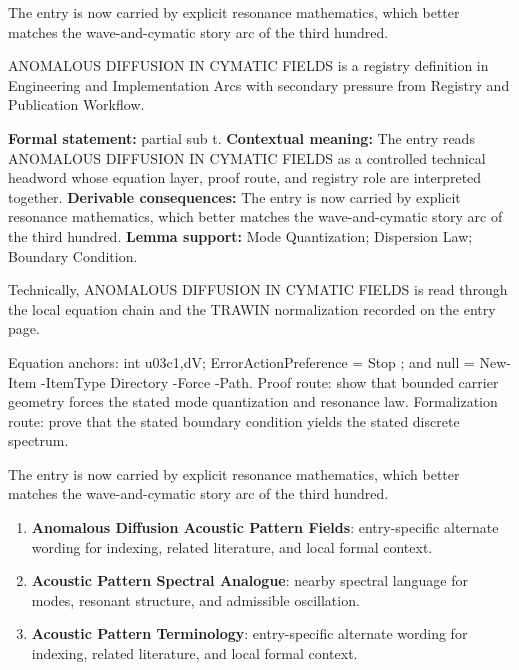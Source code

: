 The entry is now carried by explicit resonance mathematics, which better matches the wave-and-cymatic story arc of the third hundred.
\clearpage


\begingroup\small
{}
ANOMALOUS DIFFUSION IN CYMATIC FIELDS is a registry definition in Engineering and Implementation Arcs with secondary pressure from Registry and Publication Workflow.

\begingroup\footnotesize\setlength{\emergencystretch}{3em}\sloppy
\textbf{Formal statement:} partial sub t. \textbf{Contextual meaning:} The entry reads ANOMALOUS DIFFUSION IN CYMATIC FIELDS as a controlled technical headword whose equation layer, proof route, and registry role are interpreted together. \textbf{Derivable consequences:} The entry is now carried by explicit resonance mathematics, which better matches the wave-and-cymatic story arc of the third hundred. \textbf{Lemma support:} Mode Quantization; Dispersion Law; Boundary Condition.\par
\endgroup

Technically, ANOMALOUS DIFFUSION IN CYMATIC FIELDS is read through the local equation chain and the TRAWIN normalization recorded on the entry page.

Equation anchors: int u03c1,dV; ErrorActionPreference = Stop ; and null = New-Item -ItemType Directory -Force -Path. Proof route: show that bounded carrier geometry forces the stated mode quantization and resonance law. Formalization route: prove that the stated boundary condition yields the stated discrete spectrum.

The entry is now carried by explicit resonance mathematics, which better matches the wave-and-cymatic story arc of the third hundred.
\endgroup

\begin{enumerate}[leftmargin=1.6em,itemsep=6pt,topsep=4pt]
\item \textbf{Anomalous Diffusion Acoustic Pattern Fields}: entry-specific alternate wording for indexing, related literature, and local formal context.
\item \textbf{Acoustic Pattern Spectral Analogue}: nearby spectral language for modes, resonant structure, and admissible oscillation.
\item \textbf{Acoustic Pattern Terminology}: entry-specific alternate wording for indexing, related literature, and local formal context.
\end{enumerate}

